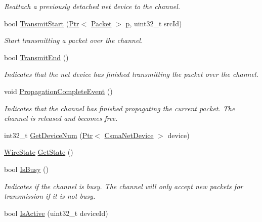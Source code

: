 \begin{DoxyCompactItemize}
\begin{DoxyCompactList}\small\item\em Reattach a previously detached net device to the channel. \end{DoxyCompactList}\item 
bool \hyperlink{classns3_1_1CsmaChannel_a413b29b1ffbcb8f2c4b3de3ed124dc95}{Transmit\+Start} (\hyperlink{classns3_1_1Ptr}{Ptr}$<$ \hyperlink{classns3_1_1Packet}{Packet} $>$ \hyperlink{lte__link__budget__x2__handover__measures_8m_ac9de518908a968428863f829398a4e62}{p}, uint32\+\_\+t src\+Id)
\begin{DoxyCompactList}\small\item\em Start transmitting a packet over the channel. \end{DoxyCompactList}\item 
bool \hyperlink{classns3_1_1CsmaChannel_a720272c5f63d9bdd32d7ca43925ee6d2}{Transmit\+End} ()
\begin{DoxyCompactList}\small\item\em Indicates that the net device has finished transmitting the packet over the channel. \end{DoxyCompactList}\item 
void \hyperlink{classns3_1_1CsmaChannel_ac7d954b0ce176022c3096a01e829ebca}{Propagation\+Complete\+Event} ()
\begin{DoxyCompactList}\small\item\em Indicates that the channel has finished propagating the current packet. The channel is released and becomes free. \end{DoxyCompactList}\item 
int32\+\_\+t \hyperlink{classns3_1_1CsmaChannel_a703a624c71495f97ec7a6c74ca9889a3}{Get\+Device\+Num} (\hyperlink{classns3_1_1Ptr}{Ptr}$<$ \hyperlink{classns3_1_1CsmaNetDevice}{Csma\+Net\+Device} $>$ device)
\item 
\hyperlink{namespacens3_aff37503a9e9f2dbe82b374050a73e105}{Wire\+State} \hyperlink{classns3_1_1CsmaChannel_af4067e0dcabf85a70563325e4ebd2ecb}{Get\+State} ()
\item 
bool \hyperlink{classns3_1_1CsmaChannel_ae655728afd05910cea503eebe5aee3cb}{Is\+Busy} ()
\begin{DoxyCompactList}\small\item\em Indicates if the channel is busy. The channel will only accept new packets for transmission if it is not busy. \end{DoxyCompactList}\item 
bool \hyperlink{classns3_1_1CsmaChannel_a53b1fd4d944f8342f96477a2d6ade7fc}{Is\+Active} (uint32\+\_\+t device\+Id)

\end{DoxyCompactItemize}
